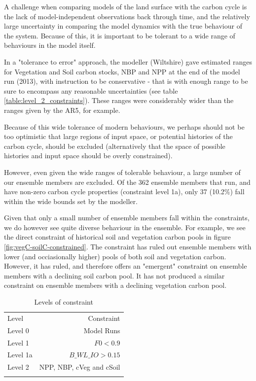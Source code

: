 \documentclass[gmd, manuscript]{copernicus}
\begin{document}
A challenge when comparing models of the land surface with the carbon cycle is the lack of model-independent observations back through time, and the relatively large uncertainty in comparing the model dynamics with the true behaviour of the system. Because of this, it is important to be tolerant to a wide range of behaviours in the model itself. 

In a "tolerance to error" approach, the modeller (Wiltshire) gave estimated ranges for Vegetation and Soil carbon stocks, NBP and NPP at the end of the model run (2013), with instruction to be conservative - that is with enough range to be sure to encompass any reasonable uncertainties (see table \ref{table:level_2_constraints}). These ranges were considerably wider than the ranges given by the AR5, for example.

Because of this wide tolerance of modern behaviours, we perhaps should not be too optimistic that large regions of input space, or potential histories of the carbon cycle, should be excluded (alternatively that the space of possible histories and input space should be overly constrained).

However, even given the wide ranges of tolerable behaviour, a large number of our ensemble members are excluded. Of the 362 ensemble members that run, and have non-zero carbon cycle properties (constraint level 1a), only 37 (10.2\%) fall within the wide bounds set by the modeller.

Given that only a small number of ensemble members fall within the constraints, we do however see quite diverse behaviour in the ensemble. For example, we see the direct constraint of historical soil and vegetation carbon pools in figure \ref{fig:vegC-soilC-constrained}. The constraint has ruled out ensemble members with lower (and occiasionally higher) pools of both soil and vegetation carbon. However, it has ruled, and therefore offers an "emergent" constraint on ensemble members with a declining soil carbon pool. It has not produced a similar constraint on ensemble members with a declining vegetation carbon pool.


\begin{table}[t]
\caption{Levels of constraint}
\label{table:levels_of_constraint}
\begin{tabular}{l r}
\tophline
Level & Constraint  \\ 
\middlehline
Level 0  & Model Runs \\
Level 1 & $F0 < 0.9$ \\
Level 1a & $B\_WL\_IO > 0.15 $ \\ 
Level 2  & NPP, NBP, cVeg and cSoil \\

\bottomhline
\end{tabular}
\belowtable{} %

\end{table}
\end{document}
